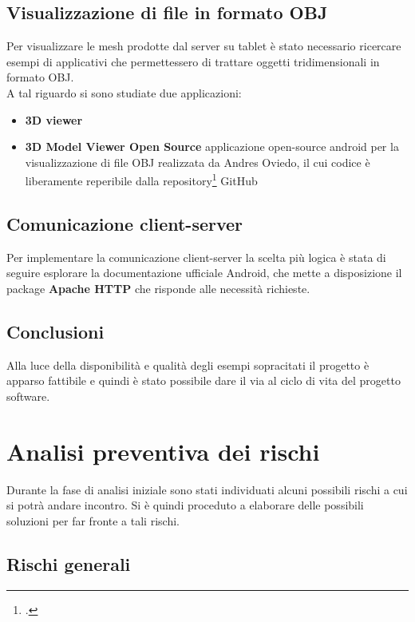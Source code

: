 \subsection{Visualizzazione di file in formato OBJ}
Per visualizzare le mesh prodotte dal server su tablet è stato necessario ricercare esempi di applicativi che permettessero di trattare oggetti tridimensionali in formato OBJ.\\
A tal riguardo si sono studiate due applicazioni:
\begin{itemize}
\item\textbf{3D viewer}\cite{site:3d-viewer}
\item\textbf{3D Model Viewer Open Source}\cite{site:3d-viewer-os}
applicazione open-source android per la visualizzazione di file OBJ realizzata da Andres Oviedo, il cui codice è liberamente reperibile dalla repository\footcite{https://github.com/andresoviedo/android-3D-model-viewer} GitHub
\end{itemize}

\subsection{Comunicazione client-server}
Per implementare la comunicazione client-server la scelta più logica è stata di seguire esplorare la documentazione ufficiale Android, che mette a disposizione il package \textbf{Apache HTTP}\cite{site:apache} che risponde alle necessità richieste.

\subsection{Conclusioni}
Alla luce della disponibilità e qualità degli esempi sopracitati il progetto è apparso fattibile e quindi è stato possibile dare il via al ciclo di vita del progetto software.


\section{Analisi preventiva dei rischi}

Durante la fase di analisi iniziale sono stati individuati alcuni possibili rischi a cui si potrà andare incontro.
Si è quindi proceduto a elaborare delle possibili soluzioni per far fronte a tali rischi.\\

\subsection{Rischi generali}

